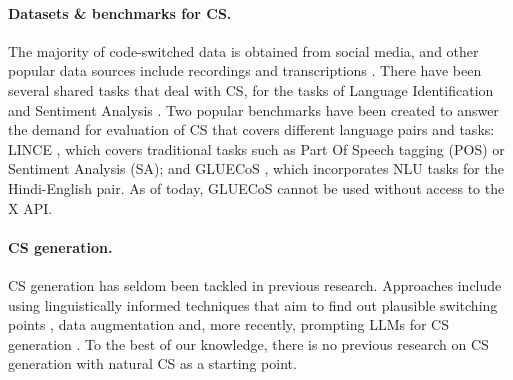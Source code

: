 \paragraph{Datasets \& benchmarks for CS.} The majority of code-switched data is obtained from social media, and other popular data sources include recordings and transcriptions \citep{winata-etal-2023-decades}. There have been several shared tasks that deal with CS, for the tasks of Language Identification \citep{solorio-etal-2014-first-shared-task,molina-etal-2016-overview-second-shared-task} and Sentiment Analysis \citep{patwa-etal-2020-semeval}. Two popular benchmarks have been created to answer the demand for evaluation of CS that covers different language pairs and tasks: LINCE \citep{aguilar-etal-2020-lince}, which covers traditional tasks such as Part Of Speech tagging (POS) or Sentiment Analysis (SA); and GLUECoS \citep{khanuja-etal-2020-gluecos}, which incorporates NLU tasks for the Hindi-English pair. As of today, GLUECoS cannot be used without access to the X API.

\paragraph{CS generation.} CS generation has seldom been tackled in previous research. Approaches include using linguistically informed techniques that aim to find out plausible switching points \citep{pratapa-etal-2018-language-modeling-synthetic,gupta-etal-2020-semi,gregorius-okadome-2022-generating-dependency}, data augmentation \citep{tarunesh-etal-2021-machine-translation} and, more recently, prompting LLMs for CS generation \citep{yong-etal-2023-prompting}. To the best of our knowledge, there is no previous research on CS generation with natural CS as a starting point.